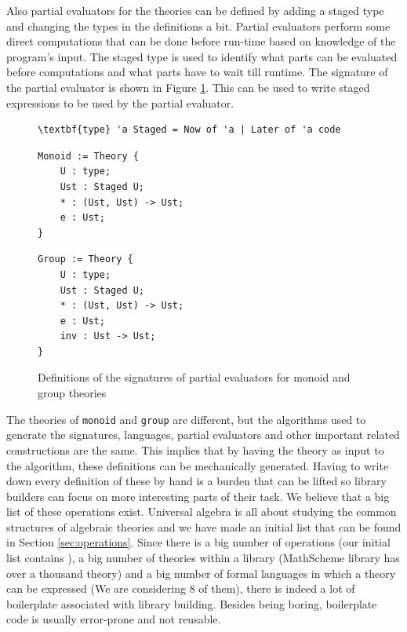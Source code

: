Also partial evaluators for the theories can be defined by adding a staged type and changing the 
types 
in the definitions a bit. Partial evaluators perform some direct computations that can be done 
before 
run-time based on knowledge of the program's input. The staged type is used to identify what parts 
can be evaluated before computations and what parts have to wait till runtime. The signature of 
the 
partial evaluator is shown in Figure \ref{fig:PE_sig}. This can be used to write staged expressions to 
be 
used by the partial evaluator. 
\begin{figure}
	\begin{Verbatim}[commandchars=\\\{\},codes={\catcode`$=3\catcode`_=8}]
\textbf{type} 'a Staged = Now of 'a | Later of 'a code 
	\end{Verbatim}
	\begin{minipage}[t]{0.5\textwidth}
		\begin{verbatim}
Monoid := Theory {
    U : type;
    Ust : Staged U; 
    * : (Ust, Ust) -> Ust;
    e : Ust;
} 
	\end{verbatim}
	\end{minipage}%
	\begin{minipage}[t]{0.5\textwidth}
		\begin{verbatim}
Group := Theory {
    U : type;
    Ust : Staged U;
    * : (Ust, Ust) -> Ust;
    e : Ust;
    inv : Ust -> Ust;
} 
	\end{verbatim}
	\end{minipage}%
	\caption{Definitions of the signatures of partial evaluators for monoid and group theories}
	\label{fig:PE_sig}
\end{figure}

The theories of \verb|monoid| and \verb|group| are different, but the algorithms used to generate the 
signatures, languages, partial evaluators and other important related constructions are the same. This 
implies that by having the theory as input to the algorithm, these definitions can be mechanically 
generated. Having to write down every definition of these by hand is a burden that can be lifted so 
library builders can focus on more interesting parts of their task. We believe that a big list of these 
operations exist. Universal algebra is all about studying the common 
structures of algebraic theories and we have made an initial list that can be found in Section 
\ref{sec:operations}. Since there is a big number of operations (our initial list contains \thryNum), a 
big 
number of theories within a library (MathScheme library has over a thousand theory) and a big number 
of formal languages in which a theory can be expressed (We are considering 8 of them), 
there is indeed a lot of boilerplate associated with library building. Besides being boring, boilerplate 
code is usually error-prone and not reusable.

